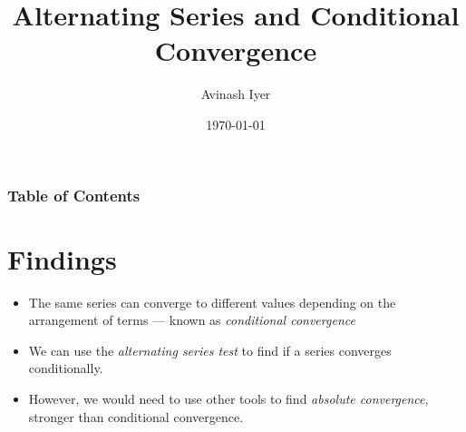 \documentclass{beamer}
\title{Alternating Series and Conditional Convergence}
\author{Avinash Iyer}
\institute{Occidental College}
\date{\today} %
\begin{document}
\begin{frame}
    \titlepage
\end{frame}
\begin{frame}
  \frametitle{Table of Contents}
  \tableofcontents
\end{frame}
\section{Findings}
\begin{frame}
  \begin{itemize}
    \item<1-> The same series can converge to different values depending on the arrangement of terms --- known as \textit{conditional convergence}
    \item<2-> We can use the \textit{alternating series test} to find if a series converges conditionally.
    \item<3-> However, we would need to use other tools to find \textit{absolute convergence}, stronger than conditional convergence.
  \end{itemize}
\end{frame}
\end{document}
